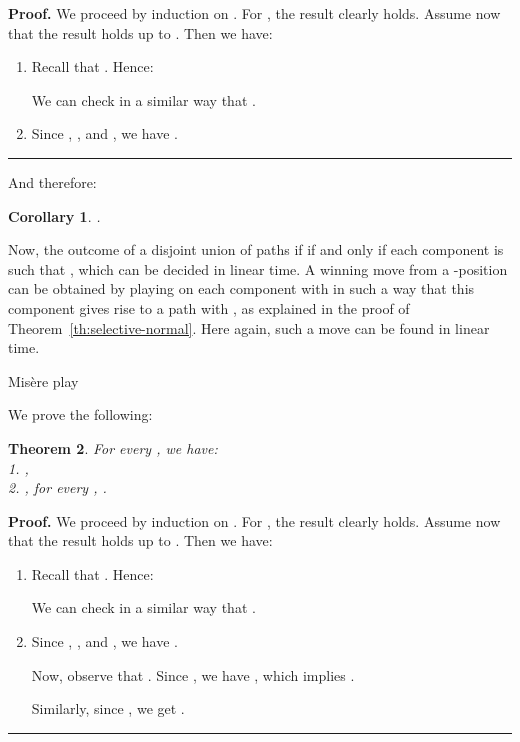 \documentclass[11pt]{article}
\newcommand{\centre}[1]{\begin{center}#1\end{center}}
\newtheorem{theorem}{Theorem}
\newtheorem{corollary}[theorem]{Corollary}
\newcommand\qed{\mbox{}\hfill\rule{0.5em}{0.809em}\par\vskip 5mm}
\newenvironment{proof}[0]{\noindent\textbf{Proof.}}{\qed}
\begin{document}
\begin{proof}
We proceed by induction on . 
For , the result clearly holds.
Assume now that the result holds up to . Then we have:

\begin{enumerate}

\item 
Recall that 
. Hence:

We can check in a similar way that .

\item 
Since ,
, 
 and
, 
we have .

\end{enumerate}
\end{proof}

And therefore:

\begin{corollary}
.
\end {corollary}

Now, the outcome of a disjoint union of paths if 
if and only if each component  is such that ,
which can be decided in linear time.
A winning move from a -position can be obtained by playing
on each component  with  in such a way that
this component gives rise to a path  with ,
as explained in the proof of Theorem~\ref{th:selective-normal}.
Here again, such a move can be found in linear time.

\vskip 4mm

\centre{{\sc Mis\`ere play}}

We prove the following:

\begin{theorem} 
For every , we have:\\
1. ,\\
2. , for every , .
\end{theorem}

\begin{proof}
We proceed by induction on .
For , the result clearly holds.
Assume now that the result holds up to . Then we have:

\begin{enumerate}

\item 
Recall that 
. Hence:

We can check in a similar way that .

\item 
Since ,
, 
 and
, 
we have .

Now, observe that . Since 
,
we have , which implies
.

Similarly, since , we get
.

\end{enumerate}
\end{proof}
\end{document}

